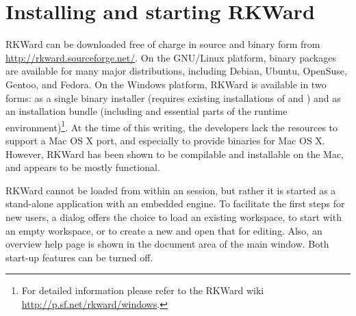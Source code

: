 \section{Installing and starting RKWard}
\label{sec:installing_starting_RKWard}
RKWard can be downloaded free of charge in source and binary form from \url{http://rkward.sourceforge.net/}. 
On the GNU/Linux platform, binary packages are available for many major distributions,
including Debian, Ubuntu, OpenSuse, Gentoo, and Fedora. On the Windows
platform, RKWard is available in two forms: as a single binary
installer (requires existing installations of
 and ) and
as an installation bundle (including  and
essential parts of the  runtime environment)\footnote{For detailed information please refer to the 
RKWard wiki \url{http://p.sf.net/rkward/windows}.}. At the time of
this writing, the developers lack the resources to support a Mac OS X
port, and especially to provide binaries for Mac OS X. However, RKWard
has been shown to be compilable and installable on the Mac, and appears
to be mostly functional.

RKWard cannot be loaded from within an 
session, but rather it is started as a stand-alone application with an
embedded  engine. To facilitate the first
steps for new users, a dialog offers the choice to load an existing
workspace, to start with an empty workspace, or to create a new
 and open that for editing. Also, an overview help page is
shown in the document area of the main window. Both start-up features
can be turned off.
